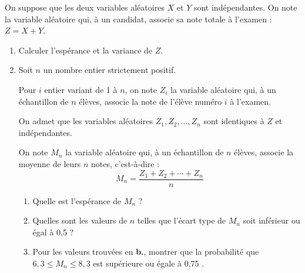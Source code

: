 \medskip

On suppose que les deux variables aléatoires $X$ et $Y$ sont indépendantes. On note la variable aléatoire qui, à un candidat, associe sa note totale à l'examen : $Z = X + Y$.

\begin{enumerate}
\item Calculer l'espérance et la variance de $Z$.

\item Soit $n$ un nombre entier strictement positif.

Pour $i$ entier variant de 1 à $n$, on note $Z_{i}$ la variable aléatoire qui, à un échantillon de $n$ élèves, associe la note de l'élève numéro $i$ à l'examen.

On admet que les variables aléatoires $Z_{1}, Z_{2}, \ldots, Z_{n}$ sont identiques à $Z$ et indépendantes.

On note $M_{n}$ la variable aléatoire qui, à un échantillon de $n$ élèves, associe la moyenne de leurs $n$ notes, c'est-à-dire :
		$$M_{n} = \dfrac{Z_{1} + Z_{2} + \cdots + Z_{n}}{n}$$

	\begin{enumerate}
		\item Quelle est l'espérance de $M_{n}$ ?

		\item Quelles sont les valeurs de $n$ telles que l'écart type de $M_{n}$ soit inférieur ou égal à 0,5 ?

		\item Pour les valeurs trouvées en \textbf{b.}, montrer que la probabilité que $6,3 \leqslant M_{n} \leqslant 8,3$ est supérieure ou égale à 0,75 .
	\end{enumerate}
\end{enumerate}
